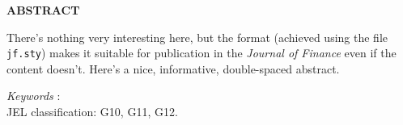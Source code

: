 \bigskip

\centerline{\bf ABSTRACT}

\begin{doublespace}  %
  \noindent There's nothing very interesting here, but the format (achieved using the file \texttt{jf.sty}) makes it suitable for publication in the \emph{Journal of Finance} even if the content doesn't. Here's a nice, informative, double-spaced abstract.
\end{doublespace}

\medskip

\noindent \textit{Keywords }: \\

\noindent JEL classification: G10, G11, G12.